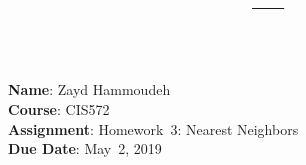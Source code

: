 \documentclass{report}
\title{\textbf{\course\ --- \assnName}}
\author{\name}
\newcommand{\name}{Zayd Hammoudeh}
\newcommand{\course}{CIS572}
\newcommand{\assnName}{Homework~3: Nearest Neighbors}
\newcommand{\dueDate}{May~2, 2019}
\begin{document}
  \maketitle

  \noindent
  \textbf{Name}: \name\\
  \textbf{Course}: \course\\
  \textbf{Assignment}: \assnName\\
  \textbf{Due Date}: \dueDate%

  \noindent

  \newpage
  
  
  
  
  
\end{document}
